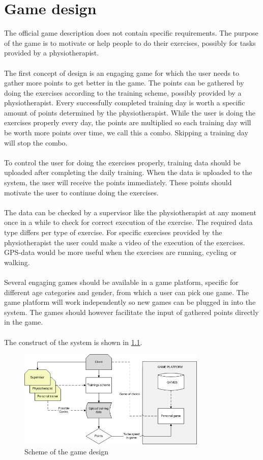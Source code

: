 \documentclass[a4paper,11pt,notitlepage]{report}
\begin{document}
\chapter{Game design}
The official game description does not contain specific requirements. The purpose of the game is to motivate or help people to do their exercises, possibly for tasks provided by a physiotherapist. \\
\\
The first concept of design is an engaging game for which the user needs to gather more points to get better in the game. The points can be gathered by doing the exercises according to the training scheme, possibly provided by a physiotherapist. Every successfully completed training day is worth a specific amount of points determined by the physiotherapist. While the user is doing the exercises properly every day, the points are multiplied so each training day will be worth more points over time, we call this a combo. Skipping a training day will stop the combo. \\
\\
To control the user for doing the exercises properly, training data should be uploaded after completing the daily training. When the data is uploaded to the system, the user will receive the points immediately. These points should motivate the user to continue doing the exercises. \\
\\
The data can be checked by a supervisor like the physiotherapist at any moment once in a while to check for correct execution of the exercise. The required data type differs per type of exercise. For specific exercises provided by the physiotherapist the user could make a video of the execution of the exercises. GPS-data would be more useful when the exercises are running, cycling or walking. \\
\\
Several engaging games should be available in a game platform, specific for different age categories and gender, from which a user can pick one game. The game platform will work independently so new games can be plugged in into the system. The games should however facilitate the input of gathered points directly in the game. \\
\\
The construct of the system is shown in \ref{fig:gamedesignscheme}. 

\begin{figure}[H]
	\centering
		\includegraphics[width=0.80\textwidth]{Images/gamedesignscheme.jpg}
	\caption{Scheme of the game design}
	\label{fig:gamedesignscheme}
\end{figure}



%
%
\end{document}
